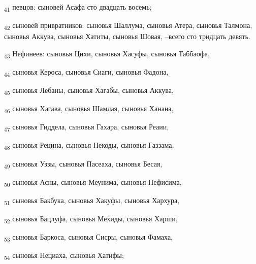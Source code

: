 \begin{tcolorbox}
\textsubscript{41} певцов: сыновей Асафа сто двадцать восемь;
\end{tcolorbox}
\begin{tcolorbox}
\textsubscript{42} сыновей привратников: сыновья Шаллума, сыновья Атера, сыновья Талмона, сыновья Аккува, сыновья Хатиты, сыновья Шовая, --всего сто тридцать девять.
\end{tcolorbox}
\begin{tcolorbox}
\textsubscript{43} Нефинеев: сыновья Цихи, сыновья Хасуфы, сыновья Таббаофа,
\end{tcolorbox}
\begin{tcolorbox}
\textsubscript{44} сыновья Кероса, сыновья Сиаги, сыновья Фадона,
\end{tcolorbox}
\begin{tcolorbox}
\textsubscript{45} сыновья Лебаны, сыновья Хагабы, сыновья Аккува,
\end{tcolorbox}
\begin{tcolorbox}
\textsubscript{46} сыновья Хагава, сыновья Шамлая, сыновья Ханана,
\end{tcolorbox}
\begin{tcolorbox}
\textsubscript{47} сыновья Гиддела, сыновья Гахара, сыновья Реаии,
\end{tcolorbox}
\begin{tcolorbox}
\textsubscript{48} сыновья Рецина, сыновья Некоды, сыновья Газзама,
\end{tcolorbox}
\begin{tcolorbox}
\textsubscript{49} сыновья Уззы, сыновья Пасеаха, сыновья Бесая,
\end{tcolorbox}
\begin{tcolorbox}
\textsubscript{50} сыновья Асны, сыновья Меунима, сыновья Нефисима,
\end{tcolorbox}
\begin{tcolorbox}
\textsubscript{51} сыновья Бакбука, сыновья Хакуфы, сыновья Хархура,
\end{tcolorbox}
\begin{tcolorbox}
\textsubscript{52} сыновья Бацлуфа, сыновья Мехиды, сыновья Харши,
\end{tcolorbox}
\begin{tcolorbox}
\textsubscript{53} сыновья Баркоса, сыновья Сисры, сыновья Фамаха,
\end{tcolorbox}
\begin{tcolorbox}
\textsubscript{54} сыновья Нециаха, сыновья Хатифы;
\end{tcolorbox}
